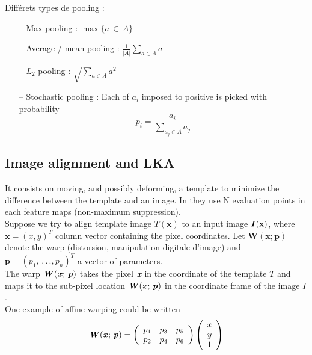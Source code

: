 \documentclass[a4paper,12pt]{report}
\newcommand\bk{\color{black}}
\newcommand\brick{\color{brick}}
\numberwithin{equation}{section} %
\begin{document}
Différets types de pooling : 
\begin{itemize}[leftmargin=2cm]
	\item[--] Max pooling : $\max \{ a \, \in \, A\}$
	\item[--] Average / mean pooling : $\frac{1}{\vert A \vert}\sum_{a\in A} a$
	\item[--] $L_2$ pooling : $\sqrt{\sum^{ ^{ }}_{a\in A} a^2}$
	\item[--] Stochastic pooling : Each of $a_i$ imposed to positive is picked with probability $$p_i = \frac{a_i}{\sum_{a_j \in A} a_j}$$
\end{itemize}

\newpage

\brick \subsection{Image alignment and LKA} \bk
It consists on moving, and possibly deforming, a template to minimize the difference between the template and an image. In \citep{gens2014deep} they use N evaluation points in each feature maps (non-maximum suppression).\\
Suppose we try to align template image $T(\textbf{x})$ to an input image $\textbf{\textit{I}}(\textbf{x})$, where $\textbf{x} = (x,y)^T$ column vector containing the pixel coordinates. Let $\textbf{W}(\textbf{x}; \textbf{p})$ denote the warp (distorsion, manipulation digitale d'image) and $\textbf{p} = (p_1,\, .\, .\, ., p_n)^T$ a vector of parameters.\\

The warp $\textbf{\textit{W}}(\textbf{\textit{x}};\, \textbf{\textit{p}})$ takes the pixel $\textit{\textbf{x}}$ in the coordinate of the template $T$ and maps it to the sub-pixel location $\textbf{\textit{W}}(\textbf{\textit{x}};\, \textbf{\textit{p}})$ in the coordinate frame of the image $I$. \\

One example of affine warping could be written 
\begin{equation*}
\textbf{\textit{W}}(\textbf{\textit{x}};\, \textbf{\textit{p}}) =  
\left( 
	{\begin{array}{cccc}
		p_1& p_3 & p_5 \\
		p_2& p_4 & p_6
 	\end{array} } 
\right)
\left( 
	{\begin{array}{c}
		x \\
		y \\
		1
	\end{array} }
\right)
\end{equation*}
\end{document}
